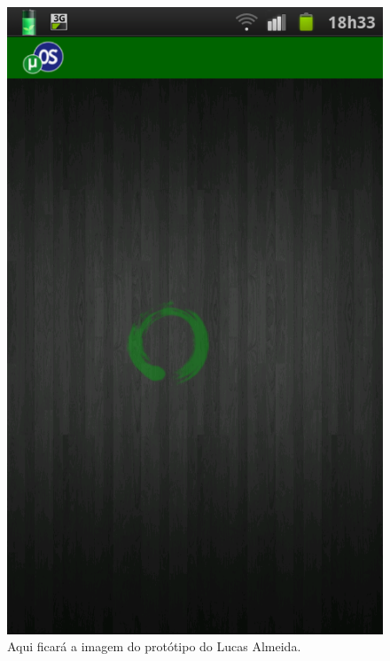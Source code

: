 \begin{figure}[h]
	\centering
	\begin{minipage}[t]{0.45\linewidth}
		\includegraphics[width=\linewidth]{imagens/printscreen_android}
		\caption{Aqui ficará a imagem do protótipo do Lucas Almeida.}
		\label{fig:printscreen_android}
	\end{minipage}
	\hfill
	\begin{minipage}[t]{0.45\linewidth}

\end{minipage}
\end{figure}
